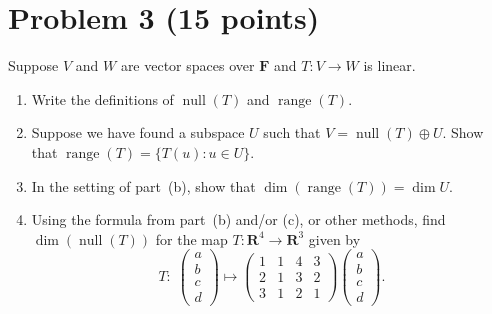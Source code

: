 \documentclass[11pt]{article}
\begin{document}
\section*{Problem 3 (15 points)}
Suppose $V$ and $W$ are vector spaces over $\mathbf{F}$ and $T: V \to W$ is linear.
\begin{enumerate}[label=\alph*)]
  \item Write the definitions of $\operatorname{null}(T)$ and $\operatorname{range}(T)$.
  \item Suppose we have found a subspace $U$ such that $V = \operatorname{null}(T) \oplus U$. Show that $\operatorname{range}(T) = \{T(u) : u \in U\}$.
  \item In the setting of part~(b), show that $\dim(\operatorname{range}(T)) = \dim U$.
  \item Using the formula from part~(b) and/or (c), or other methods, find $\dim(\operatorname{null}(T))$ for the map $T : \mathbf{R}^{4} \to \mathbf{R}^{3}$ given by
  \[
    T:\;
    \begin{pmatrix} a \\ b \\ c \\ d \end{pmatrix}
    \longmapsto
    \begin{pmatrix}
      1 & 1 & 4 & 3 \\
      2 & 1 & 3 & 2 \\
      3 & 1 & 2 & 1
    \end{pmatrix}
    \begin{pmatrix} a \\ b \\ c \\ d \end{pmatrix}.
  \]
\end{enumerate}
\medskip
\end{document}
